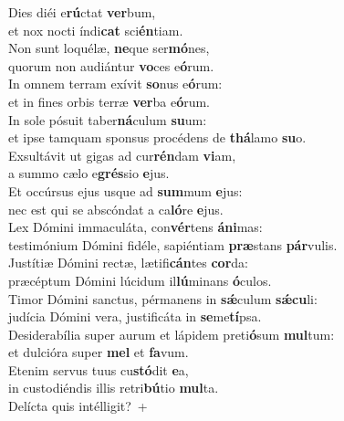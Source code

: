 \evenverse Dies diéi e\textbf{rú}ctat \textbf{ver}bum,~\*\\
\evenverse et nox nocti índi\textbf{cat} sci\textbf{én}tiam.\\
\oddverse Non sunt loquélæ, \textbf{ne}que ser\textbf{mó}nes,~\*\\
\oddverse quorum non audiántur \textbf{vo}ces e\textbf{ó}rum.\\
\evenverse In omnem terram exívit \textbf{so}nus e\textbf{ó}rum:~\*\\
\evenverse et in fines orbis terræ \textbf{ver}ba e\textbf{ó}rum.\\
\oddverse In sole pósuit taber\textbf{ná}culum \textbf{su}um:~\*\\
\oddverse et ipse tamquam sponsus procédens de \textbf{thá}lamo \textbf{su}o.\\
\evenverse Exsultávit ut gigas ad cur\textbf{rén}dam \textbf{vi}am,~\*\\
\evenverse a summo cælo e\textbf{grés}sio \textbf{e}jus.\\
\oddverse Et occúrsus ejus usque ad \textbf{sum}mum \textbf{e}jus:~\*\\
\oddverse nec est qui se abscóndat a ca\textbf{ló}re \textbf{e}jus.\\
\evenverse Lex Dómini immaculáta, con\textbf{vér}tens \textbf{á}\textbf{ni}mas:~\*\\
\evenverse testimónium Dómini fidéle, sapiéntiam \textbf{præ}stans \textbf{pár}vulis.\\
\oddverse Justítiæ Dómini rectæ, lætifi\textbf{cán}tes \textbf{cor}da:~\*\\
\oddverse præcéptum Dómini lúcidum il\textbf{lú}minans \textbf{ó}culos.\\
\evenverse Timor Dómini sanctus, pérmanens in \textbf{sǽ}culum \textbf{sǽ}\textbf{cu}li:~\*\\
\evenverse judícia Dómini vera, justificáta in \textbf{se}me\textbf{tí}psa.\\
\oddverse Desiderabília super aurum et lápidem preti\textbf{ó}sum \textbf{mul}tum:~\*\\
\oddverse et dulcióra super \textbf{mel} et \textbf{fa}vum.\\
\evenverse Etenim servus tuus cu\textbf{stó}dit \textbf{e}a,~\*\\
\evenverse in custodiéndis illis retri\textbf{bú}tio \textbf{mul}ta.\\
\oddverse Delícta quis intélligit?~+\\
